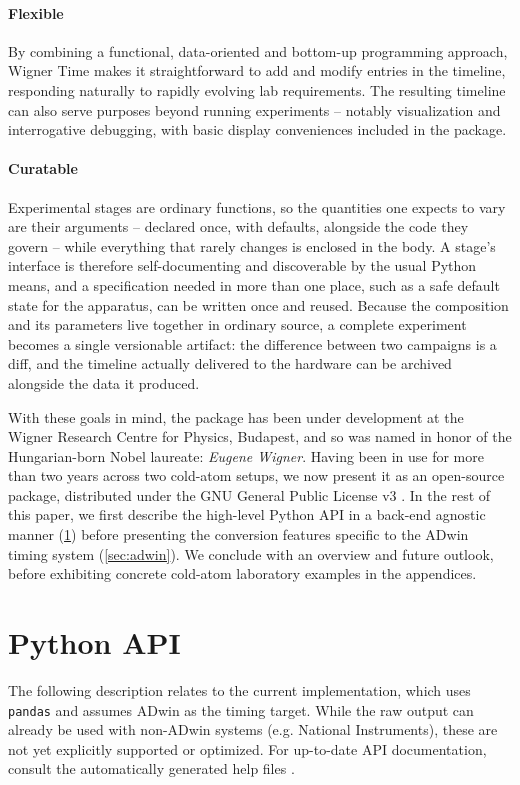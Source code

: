 \documentclass{SciPost}
\newcommand{\python}[1]{%
  \texttt{#1}%
}
\begin{document}
\paragraph{Flexible} By combining a functional, data-oriented and bottom-up programming approach, Wigner Time makes it straightforward to add and modify entries in the timeline, responding naturally to rapidly evolving lab requirements. The resulting timeline can also serve purposes beyond running experiments – notably visualization and interrogative debugging, with basic display conveniences included in the package.
 
\paragraph{Curatable} Experimental stages are ordinary functions, so the quantities one expects to vary are their arguments – declared once, with defaults, alongside the code they govern – while everything that rarely changes is enclosed in the body. A stage’s interface is therefore self-documenting and discoverable by the usual Python means, and a specification needed in more than one place, such as a safe default state for the apparatus, can be written once and reused. Because the composition and its parameters live together in ordinary source, a complete experiment becomes a single versionable artifact: the difference between two campaigns is a diff, and the timeline actually delivered to the hardware can be archived alongside the data it produced.
 
\bigskip
With these goals in mind, the package has been under development at the Wigner Research Centre for Physics, Budapest, and so was named in honor of the Hungarian-born Nobel laureate: \emph{Eugene Wigner}. Having been in use for more than two years across two cold-atom setups, we now present it as an open-source package, distributed under the GNU General Public License v3 \cite{github}. In the rest of this paper, we first describe the high-level Python API in a back-end agnostic manner (\cref{sec:pythonAPI}) before presenting the conversion features specific to the ADwin timing system (\cref{sec:adwin}). We conclude with an overview and future outlook, before exhibiting concrete cold-atom laboratory examples in the appendices.
 
\section{Python API}
\label{sec:pythonAPI}
The following description relates to the current implementation, which uses \python{pandas} and assumes ADwin as the timing target. While the raw output can already be used with non-ADwin systems (e.g. National Instruments), these are not yet explicitly supported or optimized. For up-to-date API documentation, consult the automatically generated help files \cite{wignertime_docs}.
 
\end{document}
